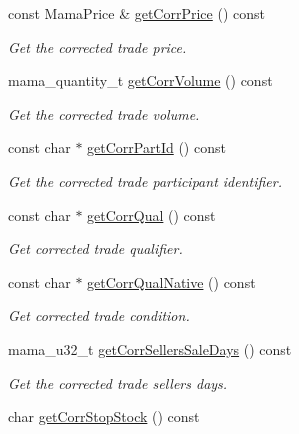 \begin{CompactItemize}
const Mama\-Price \& \hyperlink{classWombat_1_1MamdaTradeListener_221a0761538521f3ea2aea124541d07f}{get\-Corr\-Price} () const 
\begin{CompactList}\small\item\em Get the corrected trade price. \item\end{CompactList}\item 
mama\_\-quantity\_\-t \hyperlink{classWombat_1_1MamdaTradeListener_7034a77bc663978a9968c2e9f7a9184c}{get\-Corr\-Volume} () const 
\begin{CompactList}\small\item\em Get the corrected trade volume. \item\end{CompactList}\item 
const char $\ast$ \hyperlink{classWombat_1_1MamdaTradeListener_efa0c3d21cf4d4bb0443c66c20dffc33}{get\-Corr\-Part\-Id} () const 
\begin{CompactList}\small\item\em Get the corrected trade participant identifier. \item\end{CompactList}\item 
const char $\ast$ \hyperlink{classWombat_1_1MamdaTradeListener_cbb0d0f341ddad192a5c83ce148cea9f}{get\-Corr\-Qual} () const 
\begin{CompactList}\small\item\em Get corrected trade qualifier. \item\end{CompactList}\item 
const char $\ast$ \hyperlink{classWombat_1_1MamdaTradeListener_6b897066a80ca51774b8aa13e676b180}{get\-Corr\-Qual\-Native} () const 
\begin{CompactList}\small\item\em Get corrected trade condition. \item\end{CompactList}\item 
mama\_\-u32\_\-t \hyperlink{classWombat_1_1MamdaTradeListener_6078e3eb707240536af985d4135ccc5f}{get\-Corr\-Sellers\-Sale\-Days} () const 
\begin{CompactList}\small\item\em Get the corrected trade sellers days. \item\end{CompactList}\item 
char \hyperlink{classWombat_1_1MamdaTradeListener_620da60bcf2ae217b3964f677a342c88}{get\-Corr\-Stop\-Stock} () const 

\end{CompactItemize}
